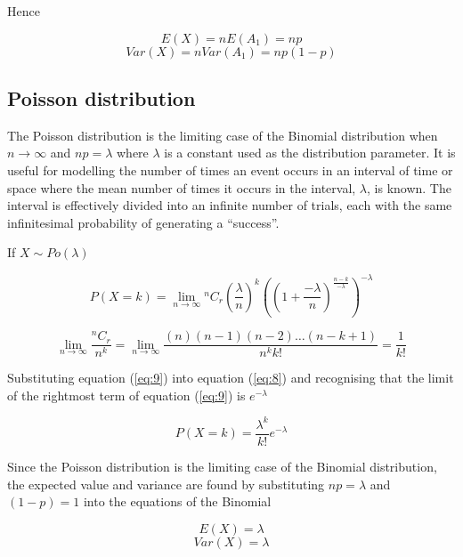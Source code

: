 \documentclass[a5paper]{article}
\begin{document}
Hence

\begin{equation}
  E(X) = nE(A_1) = np
\end{equation}
\begin{equation}
  Var(X) = nVar(A_1) = np(1-p)
\end{equation}

\subsection{Poisson distribution}

The Poisson distribution is the limiting case of the Binomial distribution when
$n\rightarrow\infty$ and $np = \lambda$ where $\lambda$ is a constant used as
the distribution parameter. It is useful for modelling the number of times an
event occurs in an interval of time or space where the mean number of times it
occurs in the interval, $\lambda$, is known. The interval is effectively divided
into an infinite number of trials, each with the same infinitesimal probability
of generating a ``success''.

If $X\sim Po(\lambda)$

\begin{equation}\label{eq:8}
  P(X\!=\!k) = \lim_{n
    \rightarrow\infty}{}^nC_r\left(\frac{\lambda}{n}\right)^k
  \left(\left(1 + \frac{-\lambda}{n}\right)^{\frac{n-k}{-\lambda}}\right)^{-\lambda}
\end{equation}

\begin{equation}\label{eq:9}
  \lim_{n\rightarrow\infty}\frac{{}^nC_r}{n^k} =
  \lim_{n\rightarrow\infty}\frac{(n)(n-1)(n-2)\ldots(n-k+1)}{n^kk!} = \frac{1}{k!}
\end{equation}

Substituting equation (\ref{eq:9}) into equation (\ref{eq:8}) and recognising
that the limit of the rightmost term of equation (\ref{eq:9}) is $e^{-\lambda}$

\begin{equation}
  P(X\!=\!k) = \frac{\lambda^k}{k!}e^{-\lambda}
\end{equation}

Since the Poisson distribution is the limiting case of the Binomial
distribution, the expected value and variance are found by substituting $np =
\lambda$ and $(1-p) = 1$ into the equations of the Binomial

\begin{equation}
  E(X) = \lambda
\end{equation}
\begin{equation}
  Var(X) = \lambda
\end{equation}
\end{document}
